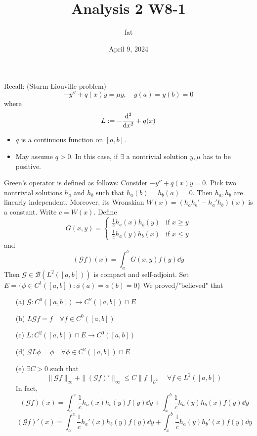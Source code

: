 \documentclass{article}
\title{Analysis 2 W8-1}
\author{fat}
\date{April 9, 2024}
\theoremstyle{definition}
\newcommand{\B}{\mathcal B}
\newcommand{\G}{\mathcal G}
\begin{document}
\maketitle
\thispagestyle{fancy}
\renewcommand{\footrulewidth}{0.4pt}
\cfoot{\thepage}
\renewcommand{\headrulewidth}{0.4pt}

Recall: (Sturm-Liouville problem)
\[
	-y'' + q(x) y = \mu y, \quad y(a) = y(b) = 0
\]
where 
\[
	L := -\dv[2]{x} + q(x)
\]

\begin{itemize}
	\item $q$ is a continuous function on $[a, b]$.
		
	\item May assume $q > 0$.
		In this case, if $\exists$ a nontrivial solution $y, \mu$ has to be positive.
\end{itemize}

Green's operator is defined as follows:
Consider $-y'' + q(x) y = 0$.
Pick two nontrivial solutions $h_a$ and $h_b$ such that $h_a(b) = h_b(a) = 0$.
Then $h_a, h_b$ are linearly independent.
Moreover, its Wronskian $W(x) = (h_a h_b' - h_a' h_b)(x)$ is a constant.
Write $c = W(x)$.
Define 
\[
	G(x, y) = 
	\begin{cases}
		\frac{1}{c} h_a(x) h_b(y) & \text{if } x \geq y\\
		\frac{1}{c} h_a(y) h_b(x) & \text{if } x \leq y 
	\end{cases}
\]
and 
\[
	(\G f)(x) = \int_a^b G(x, y) f(y) \dd{y}
\]
Then $\G \in \B(L^2([a, b]))$ is compact and self-adjoint.
Set $E = \{\phi \in C^1([a, b]): \phi(a) = \phi(b) = 0\}$
We proved/"believed" that

\begin{enumerate}
	\item[(a)] $\G:C^0([a, b]) \to C^2([a, b]) \cap E$
		
	\item[(b)] $L \G f = f \quad \forall f \in C^0([a, b])$

	\item[(c)] $L: C^2([a, b]) \cap E \to C^0([a, b])$

	\item[(d)] $\G L \phi = \phi \quad \forall \phi \in C^2([a, b]) \cap E$

	\item[(e)] $\exists C > 0$ such that
		\[
			\|\G f\|_\infty + \|(\G f)' \|_\infty \leq C \|f\|_{L^2} \quad \forall f \in L^2([a, b])
		\]
		In fact, 
		\[
			(\G f)(x) = \int_a^x \frac{1}{c} h_a(x) h_b(y) f(y) \dd{y} + \int_x^b \frac{1}{c} h_a(y) h_b(x) f(y) \dd{y}
		\]
		\[
			(\G f)'(x) = \int_a^x \frac{1}{c} h_a'(x) h_b(y) f(y) \dd{y} + \int_x^b \frac{1}{c} h_a(y) h_b'(x) f(y) \dd{y}
		\]
\end{enumerate}
\end{document}
